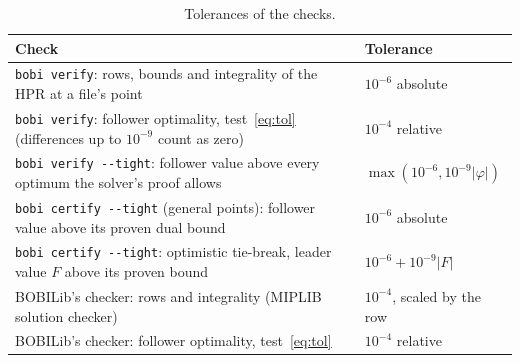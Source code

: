 \documentclass[]{spie}  %
\theoremstyle{plain}
\newcommand{\code}[1]{\texttt{#1}}
\begin{document}
\begin{table}[tb]
\caption{Tolerances of the checks.}\label{tab:tol}
\centering\small
\begin{tabular}{@{}>{\raggedright\arraybackslash}p{4.6in} l@{}}
\toprule
Check & Tolerance\\
\midrule
\code{bobi verify}: rows, bounds and integrality of the HPR at a file's point & $10^{-6}$ absolute\\
\code{bobi verify}: follower optimality, test~\eqref{eq:tol} (differences up to $10^{-9}$ count as zero) & $10^{-4}$ relative\\
\code{bobi verify -{}-tight}: follower value above every optimum the solver's proof allows & $\max(10^{-6},10^{-9}|\varphi|)$\\
\code{bobi certify -{}-tight} (general points): follower value above its proven dual bound & $10^{-6}$ absolute\\
\code{bobi certify -{}-tight}: optimistic tie-break, leader value $F$ above its proven bound & $10^{-6}+10^{-9}|F|$\\
BOBILib's checker: rows and integrality (MIPLIB solution checker) & $10^{-4}$, scaled by the row\\
BOBILib's checker: follower optimality, test~\eqref{eq:tol} & $10^{-4}$ relative\\
\bottomrule
\end{tabular}
\end{table}
\end{document}
